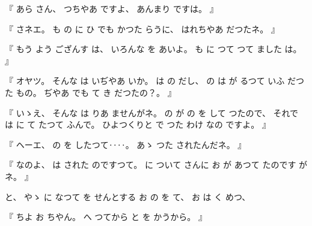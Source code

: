 %
『
あら
さん、
%
つちやあ
ですよ、
%
あんまり
ですは。
』

%
『
さネエ。
%
も
の
に
ひ
でも
かつた
らうに、
%
はれちやあ
だつたネ。
』

%
『
もう
よう
ござんす
は、
%
いろんな
を
あいよ。
%
も
に
つて
つて
ました
は。
』

%
『
オヤツ。
%
そんな
は
いぢやあ
いか。
%
は
の
だし、
%
%
の
は
が
るつて
いふ
だつた
もの。
%
ぢやあ
でも
て
き
だつたの？。
』

%
『
いゝえ、
%
そんな
は
りあ
ませんがネ。
%
の
が
の
を
して
つたので、
%
それで
は
に
て
たつて
ふんで。
%
ひよつくりと
で
つた
わけ
なの
ですよ。
』

%
『
ヘーエ、
%
の
を
したつて‥‥。
%
あゝ
つた
されたんだネ。
』

%
『
なのよ、
%
は
された
のですつて。
%
に
ついて
さんに
お
が
あつて
たのです
がネ。
』

%
と、
%
やゝ
に
なつて
を
せんとする
お
の
を
て、
%
お
は
く
めつ、

%
『
ちよ
お
ちやん。
%
へ
つてから
と
を
かうから。
』


